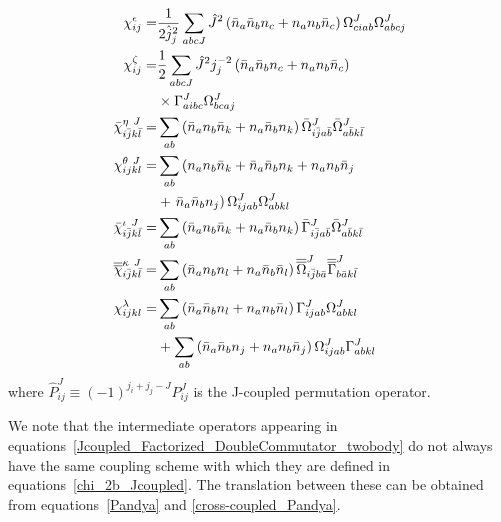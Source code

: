 \documentclass[11pt]{article}
\begin{document}
\begin{subequations}\allowdisplaybreaks[4]\label{chi_2b_Jcoupled}
\begin{align}
\chi^{\epsilon}_{ij} =& \frac{1}{2\hat{j}^2_j} \sum_{abc J} \hat{J}^2  \left( \bar{n}_a \bar{n}_b {n}_c    +  {n}_a  {n}_b \bar{n}_c \right)  \Omega^{J}_{ciab} \Omega^{J}_{abcj} \\  %
\chi^{\zeta}_{ij}  =&\frac{1}{2} \sum_{abc J} \hat{J}^2 j^{-2}_j \left( \bar{n}_a  \bar{n}_b {n}_c  + {n}_a {n}_b \bar{n}_c  \right) \nonumber \\
 &\times  \Gamma^{J}_{aibc}  \Omega^{J}_{bcaj} \\   %
\bar \chi^{\eta~J}_{i\bar jk \bar l} =& \sum_{ab} \left( \bar{n}_a  {n}_b  \bar{n}_k  +  {n}_a  \bar{n}_b  {n}_k \right) \bar \Omega^{J}_{i \bar j a \bar b} \bar \Omega^{J}_{a \bar b k \bar l} \\    %
\chi^{\theta~J}_{ijkl}  =&  \sum_{ab} \left(   {n}_a {n}_b \bar{n}_k  +  \bar{n}_a  \bar{n}_b {n}_k + {n}_a {n}_b \bar{n}_j  \right. \nonumber\\
&+  \left. \bar{n}_a  \bar{n}_b {n}_j \right)  \Omega^{J}_{ijab} \Omega^{J}_{abkl}  \\ 
\bar \chi^{\iota~J}_{i\bar j k \bar l} =& \sum_{ab} \left(   \bar{n}_a {n}_b \bar{n}_k  +  {n}_a  \bar{n}_b  {n}_k \right) \bar\Gamma^{J}_{i \bar j a \bar b}   \bar \Omega^{J}_{a \bar b k \bar l} \\     %
\overline{\overline{  \chi}}^{\kappa~J}_{i \bar jk \bar l}  =&   \sum_{ab} \left(   \bar{n}_a {n}_b {n}_l  +  {n}_a  \bar{n}_b  \bar{n}_l \right) 
    \overline{\overline{  \Omega}}^{J}_{i \bar j b \bar a} \overline{\overline{  \Gamma}}^{J}_{b \bar a k \bar l} \\     %
\chi^{\lambda~}_{ijkl}  =& \sum_{ab} \left(   \bar{n}_a \bar{n}_b {n}_l +  {n}_a  {n}_b  \bar{n}_l \right)  \Gamma^{J}_{ijab} \Omega^{J}_{abkl}    \nonumber\\   
 &+\sum_{ab} \left(   \bar{n}_a \bar{n}_b {n}_j +  {n}_a  {n}_b  \bar{n}_j \right)  \Omega^{J}_{ijab} \Gamma^{J}_{abkl}  
\end{align}
\end{subequations}
where $\hat P^{J}_{ij} \equiv (-1)^{ j_i  + j_j - J  } P^{J}_{ij} $ is the J-coupled permutation operator.
  

We note that the intermediate operators appearing in 
equations~\eqref{Jcoupled_Factorized_DoubleCommutator_twobody} do not always have the same coupling scheme with which they are defined in equations~\eqref{chi_2b_Jcoupled}.
The translation between these can be obtained from equations~\eqref{Pandya} and \eqref{cross-coupled_Pandya}.
\end{document}
